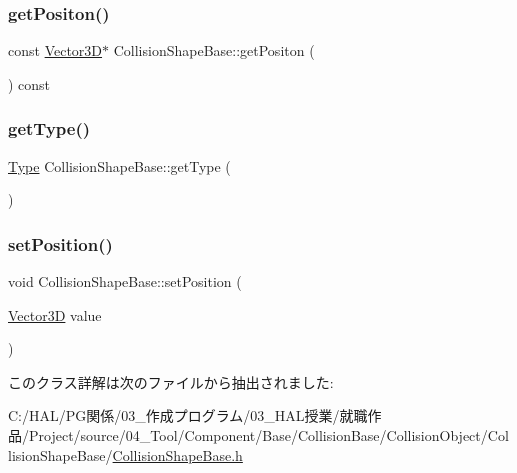 \subsubsection{\texorpdfstring{get\+Positon()}{getPositon()}}
{\footnotesize\ttfamily const \mbox{\hyperlink{class_vector3_d}{Vector3D}}$\ast$ Collision\+Shape\+Base\+::get\+Positon (\begin{DoxyParamCaption}{ }\end{DoxyParamCaption}) const\hspace{0.3cm}{\ttfamily [inline]}}

\mbox{\label{class_collision_shape_base_a662af47ebcd9f29d7c54047a0227b8bc}} 
\subsubsection{\texorpdfstring{get\+Type()}{getType()}}
{\footnotesize\ttfamily \mbox{\hyperlink{class_collision_shape_base_a8abcef092855ad0ca191047044b002cb}{Type}} Collision\+Shape\+Base\+::get\+Type (\begin{DoxyParamCaption}{ }\end{DoxyParamCaption})\hspace{0.3cm}{\ttfamily [inline]}}

\mbox{\label{class_collision_shape_base_ac14132139e486926df11f438a8600907}} 
\subsubsection{\texorpdfstring{set\+Position()}{setPosition()}}
{\footnotesize\ttfamily void Collision\+Shape\+Base\+::set\+Position (\begin{DoxyParamCaption}\item[{\mbox{\hyperlink{class_vector3_d}{Vector3D}}}]{value }\end{DoxyParamCaption})\hspace{0.3cm}{\ttfamily [inline]}}



このクラス詳解は次のファイルから抽出されました\+:\begin{DoxyCompactItemize}
\item 
C\+:/\+H\+A\+L/\+P\+G関係/03\+\_\+作成プログラム/03\+\_\+\+H\+A\+L授業/就職作品/\+Project/source/04\+\_\+\+Tool/\+Component/\+Base/\+Collision\+Base/\+Collision\+Object/\+Collision\+Shape\+Base/\mbox{\hyperlink{_collision_shape_base_8h}{Collision\+Shape\+Base.\+h}}\end{DoxyCompactItemize}
